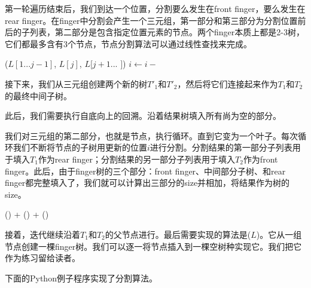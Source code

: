 \documentclass[UTF8]{article}
\begin{document}
第一轮遍历结束后，我们到达一个位置，分割要么发生在front finger，要么发生在rear finger。在finger中分割会产生一个三元组，第一部分和第三部分为分割位置前后的子列表，第二部分是包含指定位置元素的节点。两个finger本质上都是2-3树，它们都最多含有3个节点，节点分割算法可以通过线性查找来完成。

\begin{algorithmic}
      \State \Return ($L[1...j-1]$, $L[j]$, $L[j+1...$  $]$)
    \EndIf
    \State $i \gets i -$ 
  \EndFor
\EndFunction
\end{algorithmic}

接下来，我们从三元组创建两个新的树$T'_1$和$T'_2$，然后将它们连接起来作为$T_1$和$T_2$的最终中间子树。

此后，我们需要执行自底向上的回溯。沿着结果树填入所有尚为空的部分。

我们对三元组的第二部分，也就是节点，执行循环。直到它变为一个叶子。每次循环我们不断将节点的子树用更新的位置$i$进行分割。分割结果的第一部分子列表用于填入$T_1$作为rear finger；分割结果的另一部分子列表用于填入$T_2$作为front finger。此后，由于finger树的三个部分：front finger、中间部分子树、和rear finger都完整填入了，我们就可以计算出三部分的size并相加，将结果作为树的size。

\begin{algorithmic}
  \State \Return {}() + () + ()
\EndFunction
\end{algorithmic}

接着，迭代继续沿着$T_1$和$T_2$的父节点进行。最后需要实现的算法是($L$)。它从一组节点创建一棵finger树。我们可以逐一将节点插入到一棵空树种实现它。我们把它作为练习留给读者。

下面的Python例子程序实现了分割算法。
\end{document}
